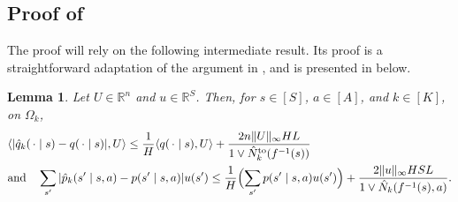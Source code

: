 \documentclass[11pt]{article}
\newcommand{\mbbR}{\mathbb{R}}
\newtheorem{lemma}[theorem]{Lemma}
\theoremstyle{definition}
\theoremstyle{definition}
\begin{document}
\subsection{Proof of \texorpdfstring{}{the bound on the cross term}}
\label{sec:proof_of_concentration_bound_nonnegative_vector}

The proof will rely on the following intermediate result.
Its proof is a straightforward adaptation of the argument in \cite[Lemma 3]{UCRLVI}, and is presented in  below.
\begin{lemma}
	\label{lem:concentration_bound_nonnegative_vector}
	Let $U\in\mbbR^n$ and $u\in\mbbR^S$.
	Then, for $s\in[S]$, $a\in[A]$, and $k\in[K]$, on $\Omega_k$,
	\begin{align}
		 &
		\langle |\hat{q}_k(\,\cdot \mid s) - q(\,\cdot \mid s)|, U \rangle
		\leq
		\frac{1}{H}\langle q(\,\cdot \mid s), U\rangle
		+
		\frac{2n \lVert U\rVert_{\infty}HL}{1\vee \hat{N}^{\mathrm{to}}_k(f^{-1}(s))}
		\label{eqn:concentration_bound_nonnegative_vector_q}
		\\
		 &
		\mathrm{and}\quad\sum_{s'}|\hat{p}_k(s' \mid s,a) - p(s' \mid s,a)| u(s')
		\leq
		\frac{1}{H}\Bigl(\sum_{s'} p(s'\mid s,a) u(s')\Bigr)
		+
		\frac{2\lVert u\rVert_{\infty}HSL}{1\vee \hat{N}_k(f^{-1}(s),a)}.
		\label{eqn:concentration_bound_nonnegative_vector_p}
	\end{align}
\end{lemma}
\end{document}
